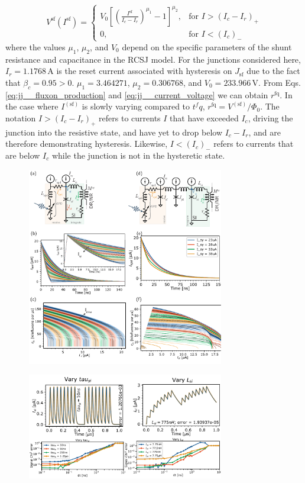 \documentclass[twocolumn]{article}
\begin{document}
\begin{equation}
\label{eq:jj__current_voltage}
V^{\mathrm{sf}}(I^{\mathrm{sf}}) = \begin{cases} V_0\left[ \left( \frac{I^{\mathrm{sf}}}{I_c-I_r} \right)^{\mu_1} - 1 \right]^{\mu_2}, & \text{for } I > (I_c-I_r)_+ \\
0, & \text{for } I < (I_c)_-
\end{cases}
\end{equation} 
where the values $\mu_1$, $\mu_2$, and $V_0$ depend on the specific parameters of the shunt resistance and capacitance in the RCSJ model. For the junctions considered here, $I_r = 1.1768$\,\textmu A is the reset current associated with hysteresis on $J_{\mathrm{sf}}$ due to the fact that $\beta_c = 0.95 > 0$. $\mu_1 = 3.464271$, $\mu_2 = 0.306768$, and $V_0 = 233.966$\,\textmu V. From Eqs.\,\ref{eq:jj__fluxon_production} and \ref{eq:jj__current_voltage} we can obtain $r^{\mathrm{fq}}$. In the case where $I^{(\mathrm{sf})}$ is slowly varying compared to $t^fq$, $ r^{\mathrm{fq}} = V^{(\mathrm{sf})}/\Phi_0$. The notation $I > (I_c-I_r)_+$ refers to currents $I$ that have exceeded $I_c$, driving the junction into the resistive state, and have yet to drop below $I_c-I_r$, and are therefore demonstrating hysteresis. Likewise, $I<(I_c)_-$ refers to currents that are below $I_c$ while the junction is not in the hysteretic state.


\begin{figure}[h!]
\includegraphics[width=8.6cm]{figures/_fig__synapses__circuits_responses.pdf}
\end{figure}

\begin{figure}[h!]
\includegraphics[width=8.6cm]{figures/_fig__synapses__comparison.pdf}
\end{figure}
\end{document}
